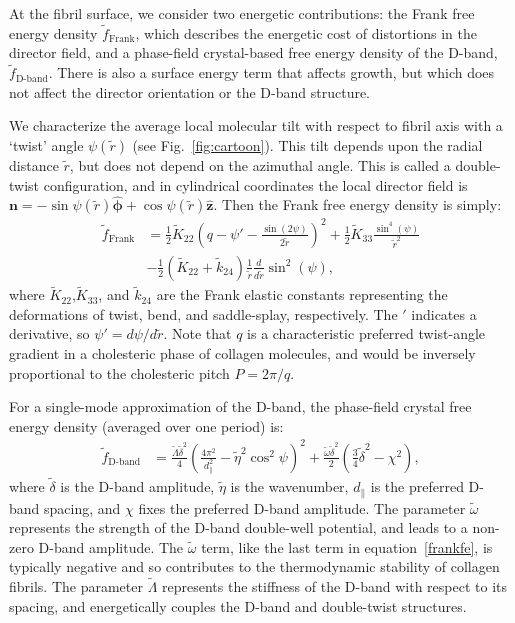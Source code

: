 \documentclass[twoside,twocolumn,9pt]{article}
\begin{document}
At the fibril surface, we consider two energetic contributions: the Frank free energy density $\tilde{f}_\text{Frank}$, which describes the energetic cost of distortions in the director field, and a phase-field crystal-based free energy density of the D-band, $\tilde{f}_\text{D-band}$. There is also a surface energy term that affects growth, but which does not affect the director orientation or the D-band structure.  

We characterize the average local molecular tilt with respect to fibril axis with a `twist' angle $\psi(\tilde{r})$ (see Fig.~\ref{fig:cartoon}). This tilt depends upon the radial distance $\tilde{r}$, but does not depend on the azimuthal angle. This is called a double-twist configuration,\cite{Brown:2014} and in cylindrical coordinates the local director field is $\boldsymbol{n} = -\sin\psi(\tilde{r}) \boldsymbol{\hat{\phi}} + \cos\psi(\tilde{r}) \boldsymbol{\hat{z}}$. Then the Frank free energy density is simply:\cite{Brown:2014}
\begin{equation}\begin{aligned}\label{frankfe}
    \tilde{f}_\text{Frank} & = \frac{1}{2}\tilde{K}_{22}\left( q - \psi' - \frac{\sin(2\psi)}{2\tilde{r}}\right)^2 + \frac{1}{2}\tilde{K}_{33} \frac{\sin^4(\psi)}{\tilde{r}^2}\\
    & - \frac{1}{2}(\tilde{K}_{22}+\tilde{k}_{24})\frac{1}{\tilde{r}}\frac{d}{d\tilde{r}}\sin^2(\psi),
\end{aligned}\end{equation}
where $\tilde{K}_{22}$,$\tilde{K}_{33}$, and $\tilde{k}_{24}$ are the Frank elastic constants representing the deformations of twist, bend, and saddle-splay, respectively. The $'$ indicates a derivative, so $\psi'= d \psi/d \tilde{r}$. Note that $q$ is a characteristic preferred twist-angle gradient in a cholesteric phase of collagen molecules, and would be inversely proportional to the cholesteric pitch $P=2\pi/q$. 

For a single-mode approximation of the D-band, the phase-field crystal free energy density (averaged over one period) is:\cite{Cameron:2020}
\begin{equation}
\begin{aligned}
    \tilde{f}_\text{D-band} & = \frac{\tilde{\Lambda}\tilde{\delta}^2}{4}\left(\frac{4\pi^2}{d_\parallel^2} - \tilde{\eta}^2\cos^2\psi\right)^2 + \frac{\tilde{\omega}\tilde{\delta}^2}{2}\left(\frac{3}{4}\tilde{\delta}^2 - \chi^2\right),
\end{aligned} \label{dband}
\end{equation}
where $\tilde{\delta}$ is the D-band amplitude, $\tilde{\eta}$ is the wavenumber, $d_\parallel$ is the preferred D-band spacing, and $\chi$ fixes the preferred D-band amplitude. The parameter $\tilde{\omega}$ represents the strength of the D-band double-well potential, and leads to a non-zero D-band amplitude. The $\tilde{\omega}$ term, like the last term in equation~\ref{frankfe}, is typically negative and so contributes to the thermodynamic stability of collagen fibrils. The parameter $\tilde{\Lambda}$ represents the stiffness of the D-band with respect to its spacing, and energetically couples the D-band and double-twist structures.
\end{document}
